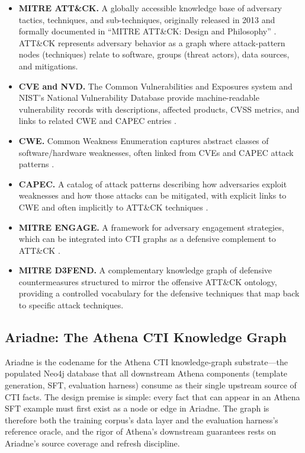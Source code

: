 \documentclass[unnumsec,webpdf,contemporary,large]{oup-authoring-template}
\theoremstyle{thmstyleone}
\theoremstyle{thmstyletwo}
\theoremstyle{thmstylethree}
\begin{document}
\begin{itemize}
  \item \textbf{MITRE ATT\&CK.} A globally accessible knowledge base of adversary tactics, techniques, and sub-techniques, originally released in 2013 and formally documented in ``MITRE ATT\&CK: Design and Philosophy'' \cite{strom2018mitreattck}. ATT\&CK represents adversary behavior as a graph where attack-pattern nodes (techniques) relate to software, groups (threat actors), data sources, and mitigations.
  \item \textbf{CVE and NVD.} The Common Vulnerabilities and Exposures system and NIST's National Vulnerability Database provide machine-readable vulnerability records with descriptions, affected products, CVSS metrics, and links to related CWE and CAPEC entries \cite{mitreCVE}.
  \item \textbf{CWE.} Common Weakness Enumeration captures abstract classes of software/hardware weaknesses, often linked from CVEs and CAPEC attack patterns \cite{mitreCWE}.
  \item \textbf{CAPEC.} A catalog of attack patterns describing how adversaries exploit weaknesses and how those attacks can be mitigated, with explicit links to CWE and often implicitly to ATT\&CK techniques \cite{mitreCAPEC}.
  \item \textbf{MITRE ENGAGE.} A framework for adversary engagement strategies, which can be integrated into CTI graphs as a defensive complement to ATT\&CK \cite{cardei2025ift}.
  \item \textbf{MITRE D3FEND.} A complementary knowledge graph of defensive countermeasures structured to mirror the offensive ATT\&CK ontology, providing a controlled vocabulary for the defensive techniques that map back to specific attack techniques.
\end{itemize}

\subsection{Ariadne: The Athena CTI Knowledge Graph}
\label{sec:ariadne}

Ariadne is the codename for the Athena CTI knowledge-graph substrate---the populated Neo4j database that all downstream Athena components (template generation, SFT, evaluation harness) consume as their single upstream source of CTI facts. The design premise is simple: every fact that can appear in an Athena SFT example must first exist as a node or edge in Ariadne. The graph is therefore both the training corpus's data layer and the evaluation harness's reference oracle, and the rigor of Athena's downstream guarantees rests on Ariadne's source coverage and refresh discipline.
\end{document}
